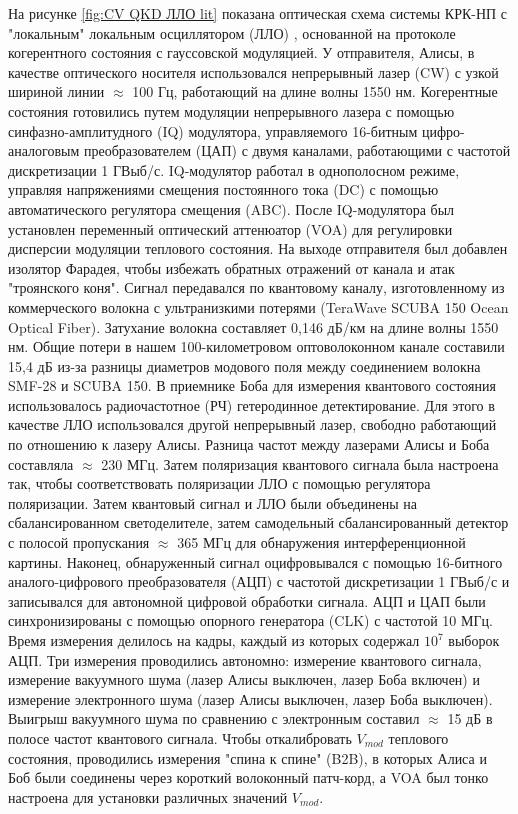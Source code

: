 На рисунке \ref{fig:CV QKD ЛЛО lit} показана оптическая схема  системы КРК-НП с "локальным" локальным осциллятором (ЛЛО) \cite{hajomer2024}, основанной на протоколе когерентного состояния с гауссовской модуляцией. У отправителя, Алисы, в качестве оптического носителя использовался непрерывный лазер (CW) с узкой шириной линии $\approx$ 100 Гц, работающий на длине волны 1550 нм. Когерентные состояния готовились путем модуляции непрерывного лазера с помощью синфазно-амплитудного (IQ) модулятора, управляемого 16-битным цифро-аналоговым преобразователем (ЦАП) с двумя каналами, работающими с частотой дискретизации 1 ГВыб/с. IQ-модулятор работал в однополосном режиме, управляя напряжениями смещения постоянного тока (DC) с помощью автоматического регулятора смещения (ABC). После IQ-модулятора был установлен переменный оптический аттенюатор (VOA) для регулировки дисперсии модуляции теплового состояния. На выходе отправителя был добавлен изолятор Фарадея, чтобы избежать обратных отражений от канала и атак "троянского коня". Сигнал передавался по квантовому каналу, изготовленному из коммерческого волокна с ультранизкими потерями (TeraWave SCUBA 150 Ocean Optical Fiber). Затухание волокна составляет 0,146 дБ/км на длине волны 1550 нм. Общие потери в нашем 100-километровом оптоволоконном канале составили 15,4 дБ из-за разницы диаметров модового поля между соединением волокна SMF-28 и SCUBA 150.
В приемнике Боба для измерения квантового состояния использовалось радиочастотное (РЧ) гетеродинное детектирование. Для этого в качестве ЛЛО использовался другой непрерывный лазер, свободно работающий по отношению к лазеру Алисы. Разница частот между
лазерами Алисы и Боба составляла $\approx$ 230 МГц. Затем поляризация квантового сигнала была настроена так, чтобы соответствовать поляризации ЛЛО с помощью регулятора поляризации. Затем квантовый сигнал и ЛЛО были объединены на сбалансированном светоделителе,
затем самодельный сбалансированный детектор с полосой пропускания
$\approx$ 365 МГц для обнаружения интерференционной картины. Наконец, обнаруженный сигнал оцифровывался с помощью 16-битного аналого-цифрового преобразователя (АЦП) с частотой дискретизации 1 ГВыб/с и записывался для автономной цифровой обработки сигнала. АЦП и ЦАП были синхронизированы с помощью опорного генератора (CLK) с частотой 10 МГц.
Время измерения делилось на кадры, каждый из которых содержал $10^7$ выборок АЦП. Три измерения проводились автономно: измерение квантового сигнала, измерение вакуумного шума (лазер Алисы выключен, лазер Боба включен) и измерение электронного шума (лазер Алисы выключен, лазер Боба выключен). Выигрыш вакуумного шума по сравнению с электронным составил $\approx$ 15 дБ в полосе частот квантового сигнала. Чтобы откалибровать $V_{mod}$ теплового состояния, проводились измерения "спина к спине" (B2B), в которых Алиса и Боб были соединены через короткий волоконный патч-корд, а VOA был тонко настроена для установки различных значений $V_{mod}$.

